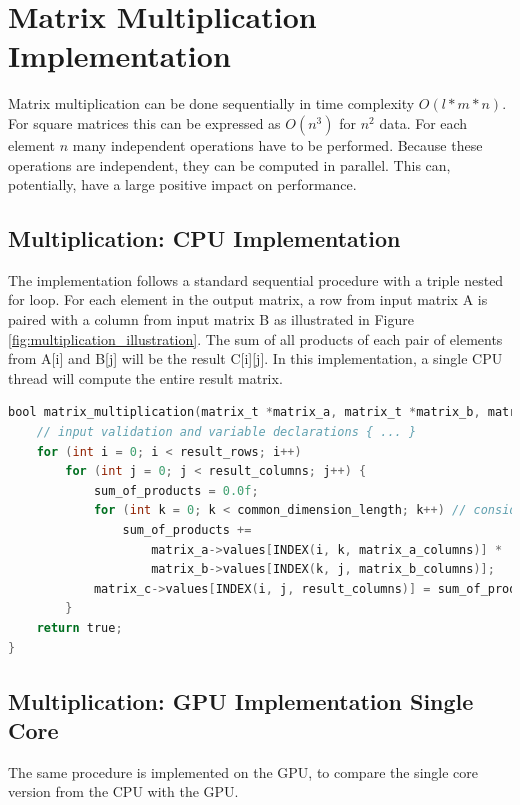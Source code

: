\section{Matrix Multiplication Implementation}

Matrix multiplication can be done sequentially in time complexity $O(l * m * n)$. For square matrices this can be expressed as $O(n^3)$ for $n^2$ data. For each element $n$ many independent operations have to be performed. Because these operations are independent, they can be computed in parallel. This can, potentially, have a large positive impact on performance. %

\subsection{Multiplication: CPU Implementation}
The implementation follows a standard sequential procedure with a triple nested for loop. For each element in the output matrix, a row from input matrix A is paired with a column from input matrix B as illustrated in Figure \ref{fig:multiplication_illustration}. The sum of all products of each pair of elements from A[i] and B[j] will be the result C[i][j]. %
In this implementation, a single CPU thread will compute the entire result matrix.

\begin{lstlisting}[language=C, caption={Matrix Multiplication on the CPU}, label={lst:matrix_multiplication_cpu}]
bool matrix_multiplication(matrix_t *matrix_a, matrix_t *matrix_b, matrix_t *matrix_c) {
    // input validation and variable declarations { ... }
    for (int i = 0; i < result_rows; i++)
        for (int j = 0; j < result_columns; j++) {
            sum_of_products = 0.0f;
            for (int k = 0; k < common_dimension_length; k++) // consider renaming to m
                sum_of_products +=
                    matrix_a->values[INDEX(i, k, matrix_a_columns)] *
                    matrix_b->values[INDEX(k, j, matrix_b_columns)];
            matrix_c->values[INDEX(i, j, result_columns)] = sum_of_products;
        }
    return true;
}
\end{lstlisting}


\subsection{Multiplication: GPU Implementation Single Core}
The same procedure is implemented on the GPU, to compare the single core version from the CPU with the GPU.

